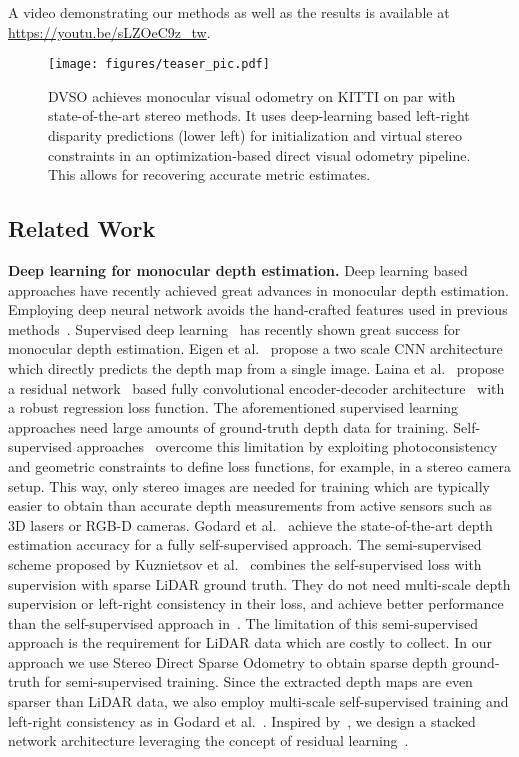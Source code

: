 \documentclass[runningheads]{llncs}
\begin{document}
A video demonstrating our methods as well as the results is available at 
\url{https://youtu.be/sLZOeC9z_tw}.
\begin{figure}[t]
	\texttt{[image: figures/teaser\_pic.pdf]}
	\caption{DVSO achieves monocular visual odometry on KITTI on par with 
	state-of-the-art stereo methods. It uses deep-learning based left-right 
	disparity predictions (lower left) for initialization and virtual stereo 
	constraints in an optimization-based direct visual odometry pipeline. This 
	allows for recovering accurate metric estimates.}
\end{figure}\subsection{Related Work}\textbf{Deep learning for monocular depth estimation.} 
Deep learning based approaches have recently achieved great advances in monocular depth estimation.
Employing deep neural network avoids the hand-crafted features used in previous methods~\cite{saxena2006learning,hoiem2005automatic}. 
Supervised deep learning~\cite{eigen2014depth,li2015depth,laina2016deeper} has recently shown great success for monocular depth estimation.
Eigen et al.~\cite{eigen2014depth,eigen2015predicting} propose a two scale CNN architecture which directly predicts the depth map from a single image. 
Laina et al.~\cite{laina2016deeper} propose a residual 
network~\cite{he2016deep} based fully convolutional encoder-decoder 
architecture~\cite{long2015fully} with a robust regression loss function. 
The aforementioned supervised learning approaches need large amounts of ground-truth depth data for training. 
Self-supervised approaches~\cite{garg2016unsupervised,xie2016deep3d,godard2016unsupervised} overcome this limitation by exploiting photoconsistency and geometric constraints to define loss functions, for example, in a stereo camera setup.
This way, only stereo images are needed for training which are typically easier to obtain than accurate depth measurements from active sensors such as 3D lasers or RGB-D cameras. 
Godard et al.~\cite{godard2016unsupervised} achieve the state-of-the-art depth estimation accuracy for a fully self-supervised approach.
The semi-supervised scheme proposed by Kuznietsov et al.~\cite{kuznietsov2017semi} combines the self-supervised loss with supervision with sparse LiDAR ground truth. 
They do not need multi-scale depth supervision or left-right consistency in their loss, and achieve better performance than the self-supervised approach in~\cite{godard2016unsupervised}. The limitation of this semi-supervised approach is the requirement for LiDAR data which are costly to collect.
In our approach we use Stereo Direct Sparse Odometry to obtain sparse depth ground-truth for semi-supervised training.
Since the extracted depth maps are even sparser than LiDAR data, we also employ multi-scale self-supervised training and left-right consistency as in Godard et al.~\cite{godard2016unsupervised}.
Inspired by~\cite{ilg2017flownet,pang2017cascade}, we design a stacked network 
architecture leveraging the concept of residual learning~\cite{he2016deep}.
\end{document}
